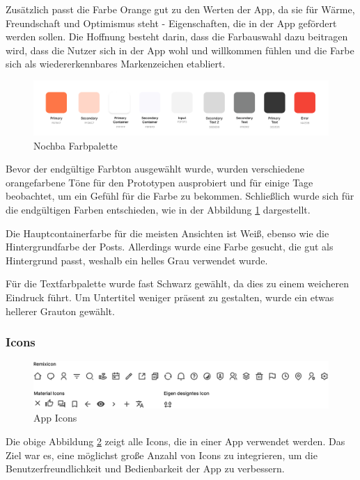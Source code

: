Zusätzlich passt die Farbe Orange gut zu den Werten der App, da sie für Wärme, Freundschaft und Optimismus steht - Eigenschaften, die in der App gefördert werden sollen. Die Hoffnung besteht darin, dass die Farbauswahl dazu beitragen wird, dass die Nutzer sich in der App wohl und willkommen fühlen und die Farbe sich als wiedererkennbares Markenzeichen etabliert.


\begin{figure}[h]
  \centering
  \includegraphics[width=1\textwidth]{pics/colors.png}
  \caption{Nochba Farbpalette}
  \label{fig:color-chart}
\end{figure}

Bevor der endgültige Farbton ausgewählt wurde, wurden verschiedene orangefarbene Töne für den Prototypen ausprobiert und für einige Tage beobachtet, um ein Gefühl für die Farbe zu bekommen. Schließlich wurde sich für die endgültigen Farben entschieden, wie in der Abbildung \ref{fig:color-chart} dargestellt.

Die Hauptcontainerfarbe für die meisten Ansichten ist Weiß, ebenso wie die Hintergrundfarbe der Posts. Allerdings wurde eine Farbe gesucht, die gut als Hintergrund passt, weshalb ein helles Grau verwendet wurde.

Für die Textfarbpalette wurde fast Schwarz gewählt, da dies zu einem weicheren Eindruck führt. Um Untertitel weniger präsent zu gestalten, wurde ein etwas hellerer Grauton gewählt.


\subsubsection{Icons}


\begin{figure}[ht]
  \centering
  \includegraphics[width=1\textwidth]{pics/icons.png}
  \caption{App Icons}
  \label{fig:app-icons}
\end{figure}

Die obige Abbildung \ref{fig:app-icons} zeigt alle Icons,
die in einer App verwendet werden. Das Ziel war es, eine
möglichst große Anzahl von Icons zu integrieren, um die
Benutzerfreundlichkeit und Bedienbarkeit der App zu
verbessern.

